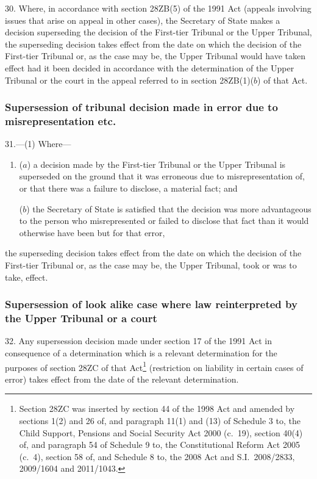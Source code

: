 \documentclass[12pt,a4paper]{article}
\begin{document}
30.  Where, in accordance with section 28ZB(5) of the 1991 Act (appeals involving issues that arise on appeal in other cases), the Secretary of State makes a decision superseding the decision of the First-tier Tribunal or the Upper Tribunal, the superseding decision takes effect from the date on which the decision of the First-tier Tribunal or, as the case may be, the Upper Tribunal would have taken effect had it been decided in accordance with the determination of the Upper Tribunal or the court in the appeal referred to in section 28ZB(1)($b$)  of that Act.

\subsubsection[31. Supersession of tribunal decision made in error due to misrepresentation etc.]{Supersession of tribunal decision made in error due to misrepresentation etc.}

31.---(1)  Where—
\begin{enumerate}\item[]
($a$) a decision made by the First-tier Tribunal or the Upper Tribunal is superseded on the ground that it was erroneous due to misrepresentation of, or that there was a failure to disclose, a material fact; and

($b$) the Secretary of State is satisfied that the decision was more advantageous to the person who misrepresented or failed to disclose that fact than it would otherwise have been but for that error,
\end{enumerate}
the superseding decision takes effect from the date on which the decision of the First-tier Tribunal or, as the case may be, the Upper Tribunal, took or was to take, effect.

\subsubsection[32. Supersession of look alike case where law reinterpreted by the Upper Tribunal or a court]{Supersession of look alike case where law reinterpreted by the Upper Tribunal or a court}

32.  Any supersession decision made under section 17 of the 1991 Act in consequence of a determination which is a relevant determination for the purposes of section 28ZC of that Act\footnote{Section 28ZC was inserted by section 44 of the 1998 Act and amended by sections 1(2) and 26 of, and paragraph 11(1) and (13) of Schedule 3 to, the Child Support, Pensions and Social Security Act 2000 (c.~19), section 40(4) of, and paragraph 54 of Schedule 9 to, the Constitutional Reform Act 2005 (c.~4), section 58 of, and Schedule 8 to, the 2008 Act and S.I.~2008/2833, 2009/1604 and 2011/1043.} (restriction on liability in certain cases of error) takes effect from the date of the relevant determination.
\end{document}
